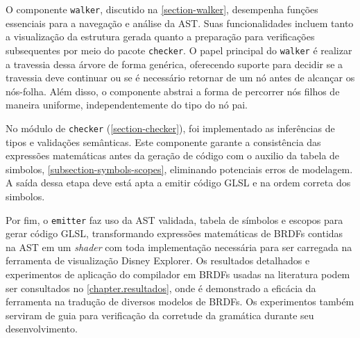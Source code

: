 O componente \texttt{walker}, discutido na \autoref{section-walker}, desempenha funções essenciais para a navegação e análise da AST. Suas funcionalidades incluem tanto a visualização da estrutura gerada quanto a preparação para verificações subsequentes por meio do pacote \texttt{checker}. O papel principal do \texttt{walker} é realizar a travessia dessa árvore de forma genérica, oferecendo suporte para decidir se a travessia deve continuar ou se é necessário retornar de um nó antes de alcançar os nós-folha. Além disso, o componente abstrai a forma de percorrer nós filhos de maneira uniforme, independentemente do tipo do nó pai.

No módulo de \texttt{checker} (\autoref{section-checker}), foi implementado as  inferências de tipos e validações semânticas. Este componente garante a consistência das expressões matemáticas antes da geração de código com o auxilio da tabela de simbolos, \autoref{subsection-symbols-scopes}, eliminando potenciais erros de modelagem. A saída dessa etapa deve está apta a emitir código GLSL e na ordem correta dos simbolos.

Por fim, o \texttt{emitter} faz uso da AST validada, tabela de símbolos e escopos para gerar código GLSL, transformando expressões matemáticas de BRDFs contidas na AST em um \textit{shader} com toda implementação necessária para ser carregada na ferramenta de visualização Disney Explorer. Os resultados detalhados e experimentos de aplicação do compilador em BRDFs usadas na literatura podem ser consultados no \autoref{chapter.resultados}, onde é demonstrado a eficácia da ferramenta na tradução de diversos modelos de BRDFs. Os experimentos também serviram de guia para verificação da corretude da gramática durante seu desenvolvimento.


